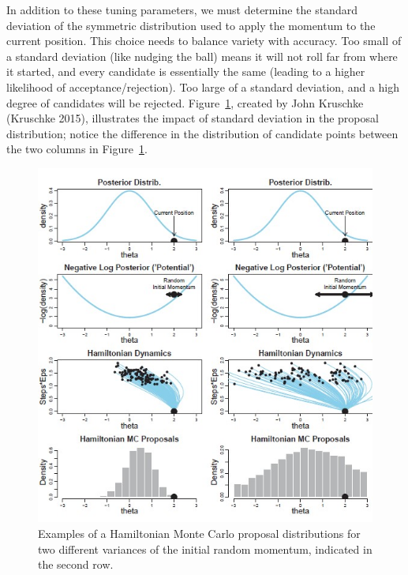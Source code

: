 \documentclass[
  letterpaper,
  DIV=11,
  numbers=noendperiod]{scrreprt}
\theoremstyle{definition}
\theoremstyle{plain}
\theoremstyle{definition}
\theoremstyle{remark}
\begin{document}
In addition to these tuning parameters, we must determine the standard
deviation of the symmetric distribution used to apply the momentum to
the current position. This choice needs to balance variety with
accuracy. Too small of a standard deviation (like nudging the ball)
means it will not roll far from where it started, and every candidate is
essentially the same (leading to a higher likelihood of
acceptance/rejection). Too large of a standard deviation, and a high
degree of candidates will be rejected. Figure~\ref{fig-mcmc-p3}, created
by John Kruschke (Kruschke 2015), illustrates the impact of standard
deviation in the proposal distribution; notice the difference in the
distribution of candidate points between the two columns in
Figure~\ref{fig-mcmc-p3}.

\begin{figure}

{\centering \includegraphics{images/Kruschke-Fig3.jpg}

}

\caption{\label{fig-mcmc-p3}Examples of a Hamiltonian Monte Carlo
proposal distributions for two different variances of the initial random
momentum, indicated in the second row.}

\end{figure}
\end{document}
